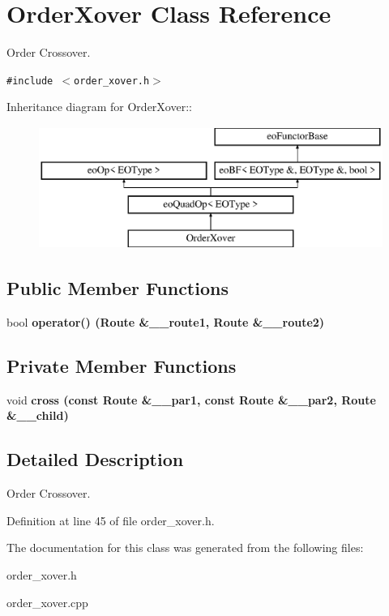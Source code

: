 \section{Order\-Xover Class Reference}
\label{class_order_xover}
Order Crossover.  


{\tt \#include $<$order\_\-xover.h$>$}

Inheritance diagram for Order\-Xover::\begin{figure}[H]
\begin{center}
\leavevmode
\includegraphics[height=4cm]{class_order_xover}
\end{center}
\end{figure}
\subsection*{Public Member Functions}
\begin{CompactItemize}
\item 
bool \bf{operator()} (\bf{Route} \&\_\-\_\-route1, \bf{Route} \&\_\-\_\-route2)\label{class_order_xover_0ff6aada669eb8173322ed68cda1ac61}

\end{CompactItemize}
\subsection*{Private Member Functions}
\begin{CompactItemize}
\item 
void \bf{cross} (const \bf{Route} \&\_\-\_\-par1, const \bf{Route} \&\_\-\_\-par2, \bf{Route} \&\_\-\_\-child)\label{class_order_xover_d2bf90b5f46ac4a344777e17bc5f364d}

\end{CompactItemize}


\subsection{Detailed Description}
Order Crossover. 



Definition at line 45 of file order\_\-xover.h.

The documentation for this class was generated from the following files:\begin{CompactItemize}
\item 
order\_\-xover.h\item 
order\_\-xover.cpp\end{CompactItemize}
